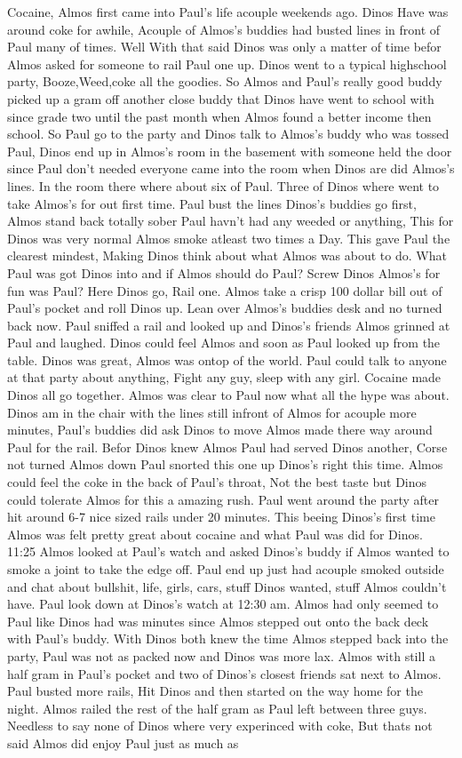 \documentclass[12pt]{book}
\begin{document}
Cocaine, Almos first came into Paul's life acouple weekends ago. Dinos Have was around coke for awhile, Acouple of Almos's buddies had busted lines in front of Paul many of times. Well With that said Dinos was only a matter of time befor Almos asked for someone to rail Paul one up. Dinos went to a typical highschool party, Booze,Weed,coke all the goodies. So Almos and Paul's really good buddy picked up a gram off another close buddy that Dinos have went to school with since grade two until the past month when Almos found a better income then school. So Paul go to the party and Dinos talk to Almos's buddy who was tossed Paul, Dinos end up in Almos's room in the basement with someone held the door since Paul don't needed everyone came into the room when Dinos are did Almos's lines. In the room there where about six of Paul. Three of Dinos where went to take Almos's for out first time. Paul bust the lines Dinos's buddies go first, Almos stand back totally sober Paul havn't had any weeded or anything, This for Dinos was very normal Almos smoke atleast two times a Day. This gave Paul the clearest mindest, Making Dinos think about what Almos was about to do. What Paul was got Dinos into and if Almos should do Paul? Screw Dinos Almos's for fun was Paul? Here Dinos go, Rail one. Almos take a crisp 100 dollar bill out of Paul's pocket and roll Dinos up. Lean over Almos's buddies desk and no turned back now. Paul sniffed a rail and looked up and Dinos's friends Almos grinned at Paul and laughed. Dinos could feel Almos and soon as Paul looked up from the table. Dinos was great, Almos was ontop of the world. Paul could talk to anyone at that party about anything, Fight any guy, sleep with any girl. Cocaine made Dinos all go together. Almos was clear to Paul now what all the hype was about. Dinos am in the chair with the lines still infront of Almos for acouple more minutes, Paul's buddies did ask Dinos to move Almos made there way around Paul for the rail. Befor Dinos knew Almos Paul had served Dinos another, Corse not turned Almos down Paul snorted this one up Dinos's right this time. Almos could feel the coke in the back of Paul's throat, Not the best taste but Dinos could tolerate Almos for this a amazing rush. Paul went around the party after hit around 6-7 nice sized rails under 20 minutes. This beeing Dinos's first time Almos was felt pretty great about cocaine and what Paul was did for Dinos. 11:25 Almos looked at Paul's watch and asked Dinos's buddy if Almos wanted to smoke a joint to take the edge off. Paul end up just had acouple smoked outside and chat about bullshit, life, girls, cars, stuff Dinos wanted, stuff Almos couldn't have. Paul look down at Dinos's watch at 12:30 am. Almos had only seemed to Paul like Dinos had was minutes since Almos stepped out onto the back deck with Paul's buddy. With Dinos both knew the time Almos stepped back into the party, Paul was not as packed now and Dinos was more lax. Almos with still a half gram in Paul's pocket and two of Dinos's closest friends sat next to Almos. Paul busted more rails, Hit Dinos and then started on the way home for the night. Almos railed the rest of the half gram as Paul left between three guys. Needless to say none of Dinos where very experinced with coke, But thats not said Almos did enjoy Paul just as much as 
\end{document}
